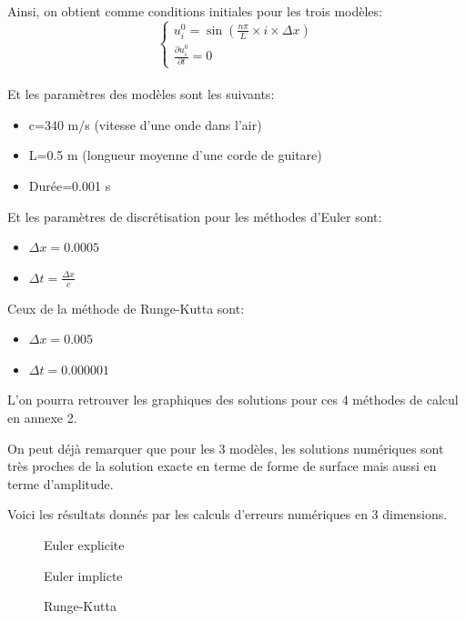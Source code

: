Ainsi, on obtient comme conditions initiales pour les trois modèles:
  \[
      \begin{cases}
        u^{0}_{i}=\sin(\frac{n \pi }{L} \times i \times \Delta x) \\
        \frac{\partial u^0_{i}}{\partial t}= 0
      \end{cases}
    \]\\
Et les paramètres des modèles sont les suivants:
\begin{itemize}
    \item c=340 m/s (vitesse d'une onde dans l'air)
    \item L=0.5 m (longueur moyenne d'une corde de guitare)
    \item Durée=0.001 s\\ 
\end{itemize}
Et les paramètres de discrétisation pour les méthodes d'Euler sont:
\begin{itemize}
    \item $\Delta x=0.0005$
    \item $\Delta t=\frac{\Delta x}{c}$
\end{itemize}
\newline
Ceux de la méthode de Runge-Kutta sont: 
\begin{itemize}
    \item $\Delta x=0.005$
    \item $\Delta t=0.000001$
\end{itemize}

L'on pourra retrouver les graphiques des solutions pour ces 4 méthodes de calcul en annexe 2.


On peut déjà remarquer que pour les 3 modèles, les solutions numériques sont très proches de la solution exacte en terme de forme de surface mais aussi en terme d'amplitude.


Voici les résultats donnés par les calculs d'erreurs numériques en 3 dimensions.
\begin{figure}[H]
\begin{minipage}[b]{.46\linewidth}
\centering{}
\caption{Euler explicite
    \label{fig1}
    }
\end{minipage} \hfill
\begin{minipage}[b]{.46\linewidth}
\centering{}
\caption{Euler implicte\label{fig2}}
\end{minipage}
\end{figure}


\begin{figure}[H]
\begin{center}
\begin{minipage}[b]{.46\linewidth}
\centering{}
\caption{Runge-Kutta\label{fig1}}
\end{minipage} \hfill
\end{center}
\end{figure}


